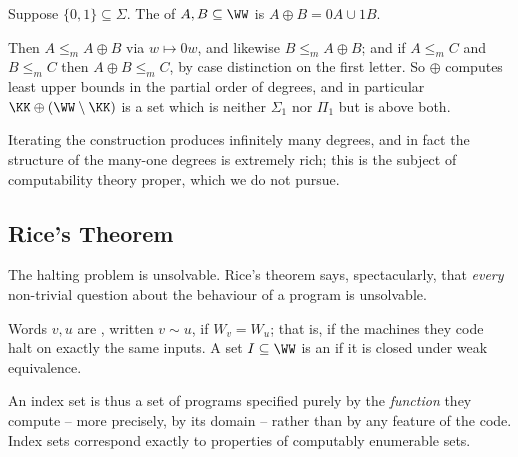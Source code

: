 \begin{definition}
	Suppose $\{0,1\}\subseteq\Sigma$. The  of $A, B \subseteq \WW$ is $A \oplus B = 0A \cup 1B$.
\end{definition}

Then $A \leq_m A\oplus B$ via $w \mapsto 0w$, and likewise $B \leq_m A \oplus B$; and if $A \leq_m C$ and $B \leq_m C$ then $A \oplus B \leq_m C$, by case distinction on the first letter. So $\oplus$ computes least upper bounds in the partial order of degrees, and in particular $\KK \oplus (\WW\setminus\KK)$ is a set which is neither $\Sigma_1$ nor $\Pi_1$ but is above both.

\begin{center}
\end{center}

Iterating the construction produces infinitely many degrees, and in fact the structure of the many-one degrees is extremely rich; this is the subject of computability theory proper, which we do not pursue.

\subsection{Rice's Theorem}

The halting problem is unsolvable. Rice's theorem says, spectacularly, that \emph{every} non-trivial question about the behaviour of a program is unsolvable.

\begin{definition}
	Words $v, u$ are , written $v \sim u$, if $W_v = W_u$; that is, if the machines they code halt on exactly the same inputs. A set $I \subseteq \WW$ is an  if it is closed under weak equivalence.
\end{definition}

An index set is thus a set of programs specified purely by the \emph{function} they compute -- more precisely, by its domain -- rather than by any feature of the code. Index sets correspond exactly to properties of computably enumerable sets.

